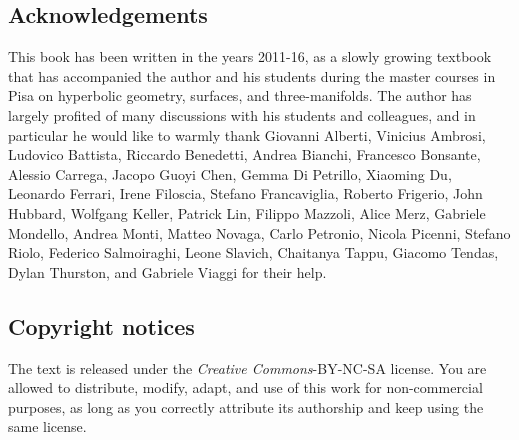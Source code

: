 \documentclass [11pt]{amsbook}
\theoremstyle{definition}
\theoremstyle{remark}
\numberwithin{section}{chapter}  %
\numberwithin{subsection}{section}  %
\numberwithin{figure}{chapter}
\numberwithin{table}{chapter}
\begin{document}
\subsection*{Acknowledgements}
This book has been written in the years 2011-16, as a slowly growing textbook that has accompanied the author and his students during the master courses in Pisa on hyperbolic geometry, surfaces, and three-manifolds. The author has largely profited of many discussions with his students and colleagues, and in particular he would like to warmly thank Giovanni Alberti, Vinicius Ambrosi, Ludovico Battista, Riccardo Benedetti, Andrea Bianchi, Francesco Bonsante, Alessio Carrega, Jacopo Guoyi Chen, Gemma Di Petrillo, Xiaoming Du, Leonardo Ferrari, Irene Filoscia, Stefano Francaviglia, Roberto Frigerio, John Hubbard, Wolfgang Keller, Patrick Lin, Filippo Mazzoli, Alice Merz, Gabriele Mondello, Andrea Monti, Matteo Novaga, Carlo Petronio, Nicola Picenni, Stefano Riolo, Federico Salmoiraghi, Leone Slavich, Chaitanya Tappu, Giacomo Tendas, Dylan Thurston, and Gabriele Viaggi for their help.

\subsection*{Copyright notices}
The text is released under the  \emph{Creative Commons}-BY-NC-SA license. 
You are allowed to distribute, modify, adapt, and use of this work for non-commercial purposes, as long as you correctly attribute its authorship and keep using the same license. 
 
\end{document}
